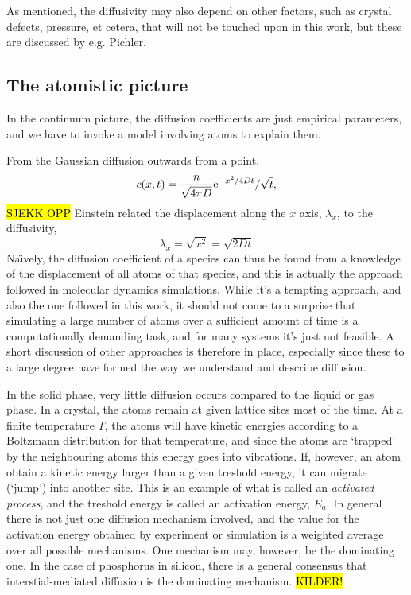 \documentclass[11pt,bibliography=totoc,index=totoc]{scrbook}   %
\newcommand{\comment}[1]{\hl{#1}}
\begin{document}
As mentioned, the diffusivity may also depend on other factors, such as crystal defects, pressure, et cetera, that will not be touched upon in this work, but these are discussed by e.g. Pichler.\cite{Pichler:2004}

\subsection{The atomistic picture}

In the continuum picture, the diffusion coefficients are just empirical parameters, and we have to invoke a model involving atoms to explain them.

From the Gaussian diffusion outwards from a point,
\begin{equation}
    c(x,t) = \frac{n}{\sqrt{4\pi D}} \mathrm{e}^{-x^2/4Dt} / \sqrt{t},
\end{equation}
\comment{SJEKK OPP}
Einstein related the displacement along the $x$ axis, $\lambda_x$, to the diffusivity\cite{Einstein:1905},
\begin{equation}
    \lambda_x = \sqrt{x^2} = \sqrt{2Dt}
  \label{eq:einsteinRelationSimple}
\end{equation}
Na\"{\i}vely, the diffusion coefficient of a species can thus be found from a knowledge of the displacement of all atoms of that species,
and this is actually the approach followed in molecular dynamics simulations.
While it's a tempting approach, and also the one followed in this work, it should not come to a surprise that simulating a large number of atoms over a sufficient amount of time is a computationally demanding task, and for many systems it's just not feasible. 
A short discussion of other approaches is therefore in place, especially since these to a large degree have formed the way we understand and describe diffusion.

In the solid phase, very little diffusion occurs compared to the liquid or gas phase. 
In a crystal, the atoms remain at given lattice sites most of the time.
At a finite temperature $T$, the atoms will have kinetic energies according to a Boltzmann distribution for that temperature,
and since the atoms are `trapped' by the neighbouring atoms this energy goes into vibrations. 
If, however, an atom obtain a kinetic energy larger than a given treshold energy, it can migrate (`jump') into another site.
This is an example of what is called an \emph{activated process}, and the treshold energy is called an activation energy, $E_a$.
In general there is not just one diffusion mechanism involved, and the value for the activation energy obtained by experiment or simulation is a weighted average over all possible mechanisms.
One mechanism may, however, be the dominating one. In the case of phosphorus in silicon, there is a general consensus that interstial-mediated diffusion is the dominating mechanism. \comment{KILDER!}
\end{document}
